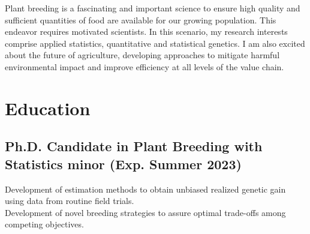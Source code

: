 \documentclass[]{mdkrause_cv_openfont}
\begin{document}
%
%

%
%

%
%

\begin{minipage}[t]{1\textwidth} 

\sectionsep

Plant breeding is a fascinating and important science to ensure high quality and sufficient quantities of food are available for our growing population. This endeavor requires motivated scientists. In this scenario, my research interests comprise applied statistics, quantitative and statistical genetics. I am also excited about the future of agriculture, developing approaches to mitigate harmful environmental impact and improve efficiency at all levels of the value chain.

\sectionsep


\section{Education} 

\sectionsep

\subsection{Ph.D. Candidate in Plant Breeding with Statistics minor (Exp. Summer 2023)}
 Development of
estimation methods to obtain unbiased realized genetic gain using data from routine field trials. \\ 
\hspace{1.55 cm} Development of novel breeding strategies to assure optimal trade-offs among
competing objectives.

\sectionsep
\vspace{0.2 mm}


\end{minipage}
\end{document}
